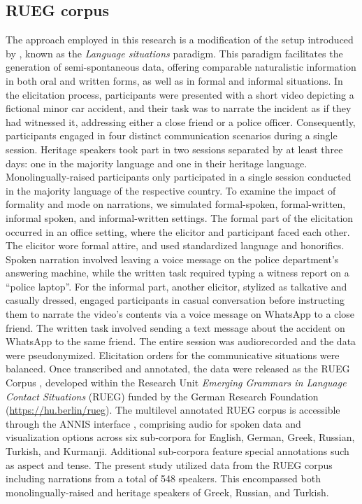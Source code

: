 \documentclass[output=paper,colorlinks,citecolor=brown]{langscibook}
\begin{document}
\subsection{RUEG corpus} \label{sec:oezsoy:ruegcorpus}
The approach employed in this research is a modification of the setup introduced by \textcite{wiese2020language}, known as the \textit{Language situations} paradigm. This paradigm facilitates the generation of semi-spontaneous data, offering comparable naturalistic information in both oral and written forms, as well as in formal and informal situations. In the elicitation process, participants were presented with a short video depicting a fictional minor car accident, and their task was to narrate the incident as if they had witnessed it, addressing either a close friend or a police officer.
Consequently, participants engaged in four distinct communication scenarios during a single session. Heritage speakers took part in two sessions separated by at least three days: one in the majority language and one in their heritage language. Monolingually-raised participants only participated in a single session conducted in the majority language of the respective country.
To examine the impact of formality and mode on narrations, we simulated formal-spoken, formal-written, informal spoken, and informal-written settings. The formal part of the elicitation occurred in an office setting, where the elicitor and participant faced each other. The elicitor wore formal attire, and used standardized language and honorifics. Spoken narration involved leaving a voice message on the police department's answering machine, while the written task required typing a witness report on a ``police laptop''.
For the informal part, another elicitor, stylized as talkative and casually dressed, engaged participants in casual conversation before instructing them to narrate the video's contents via a voice message on WhatsApp to a close friend. The written task involved sending a text message about the accident on WhatsApp to the same friend. The entire session was audiorecorded and the data were pseudonymized.
Elicitation orders for the communicative situations were balanced.
Once transcribed and annotated, the data were released as the RUEG Corpus \parencite{RUEGcorpus2024}, developed within the Research Unit \textit{Emerging Grammars in Language Contact Situations} (RUEG) funded by the German Research Foundation (\url{https://hu.berlin/rueg}). The multilevel annotated RUEG corpus is accessible through the ANNIS interface \parencite{ANNIS3}, comprising audio for spoken data and visualization options across six sub-corpora for English, German, Greek, Russian, Turkish, and Kurmanji. Additional sub-corpora feature special annotations such as aspect and tense. The present study utilized data from the RUEG corpus \parencite{RUEGcorpus2024} including narrations from a total of 548 speakers. This encompassed both monolingually-raised and heritage speakers of Greek, Russian, and Turkish. 
\end{document}
